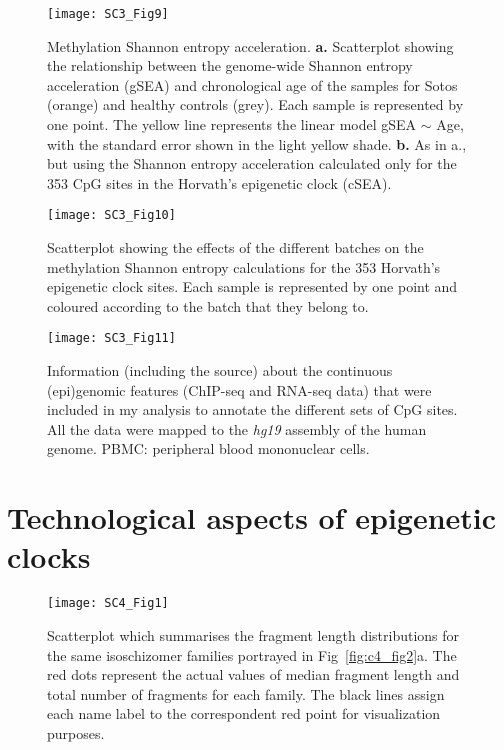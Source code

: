 \begin{figure}[htbp!] 
	\centering    
	\texttt{[image: SC3\_Fig9]}
	\caption[Methylation Shannon entropy acceleration]{Methylation Shannon entropy acceleration. \textbf{a.} Scatterplot showing the relationship between the genome-wide Shannon entropy acceleration (\acrshort{gSEA}) and chronological age of the samples for Sotos (orange) and healthy controls (grey). Each sample is represented by one point. The yellow line represents the linear model gSEA $\sim$ Age, with the standard error shown in the light yellow shade. \textbf{b.} As in a., but using the Shannon entropy acceleration calculated only for the 353 CpG sites in the Horvath's epigenetic clock (\acrshort{cSEA}).}
	\label{fig:sc3_fig9}
\end{figure}

\begin{figure}[htbp!] 
	\centering    
	\texttt{[image: SC3\_Fig10]}
	\caption[Batch effects in the methylation Shannon entropy for the epigenetic clock sites]{Scatterplot showing the effects of the different batches on the methylation Shannon entropy calculations for the 353 Horvath's epigenetic clock sites. Each sample is represented by one point and coloured according to the batch that they belong to. }
	\label{fig:sc3_fig10}
\end{figure}

		

\begin{figure}[htbp!] 
	\centering    
	\texttt{[image: SC3\_Fig11]}
	\caption[Information for the continuous (epi)genomic features]{Information (including the source) about the continuous (epi)genomic features (\acrshort{ChIP-seq} and \acrshort{RNA-seq} data) that were included in my analysis to annotate the different sets of CpG sites. All the data were mapped to the \textit{\acrshort{hg19}} assembly of the human genome. \acrshort{PBMC}: peripheral blood mononuclear cells.}
	\label{fig:sc3_fig11}
\end{figure}

\clearpage

\renewcommand{\thesection}{S.3}   
\section{Technological aspects of epigenetic clocks}

\renewcommand\thefigure{S3.\arabic{figure}}    
\bigskip

\begin{figure}[htbp!] 
	\centering    
	\setcounter{figure}{0}
	\texttt{[image: SC4\_Fig1]}
	\caption[Scatterplot of fragment length distributions for the isoschizomer families]{Scatterplot which summarises the fragment length distributions for the same isoschizomer families portrayed in Fig~\ref{fig:c4_fig2}a. The red dots represent the actual values of median fragment length and total number of fragments for each family. The black lines assign each name label to the correspondent red point for visualization purposes.}
	\label{fig:sc4_fig1}
\end{figure}

